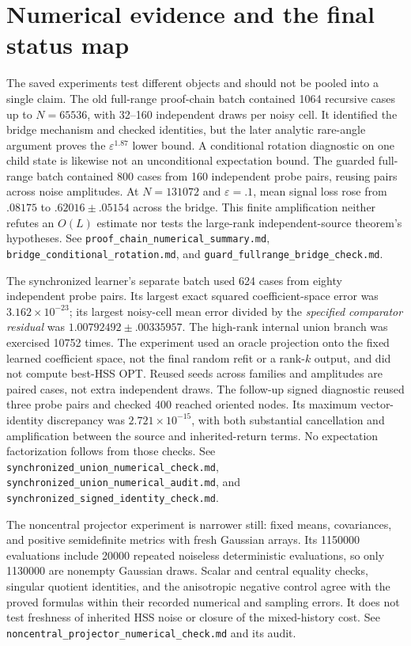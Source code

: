 \documentclass[11pt,oneside,openany,a4paper]{report}
\numberwithin{equation}{chapter}
\theoremstyle{definition}
\theoremstyle{remark}
\newcommand{\sourcefile}[1]{{\small\nolinkurl{#1}}}
\begin{document}
\section{Numerical evidence and the final status map}
\label{sec:later-status}

The saved experiments test different objects and should not be pooled
into a single claim.  The old full-range proof-chain batch contained
1064 recursive cases up to $N=65536$, with 32--160 independent draws
per noisy cell.  It identified the bridge mechanism and checked
identities, but the later analytic rare-angle argument proves the
$\varepsilon^{1.87}$ lower bound.  A conditional rotation diagnostic
on one child state is likewise not an unconditional expectation bound.
The guarded full-range batch contained 800 cases from 160 independent
probe pairs, reusing pairs across noise amplitudes.  At $N=131072$ and
$\varepsilon=.1$, mean signal loss rose from $.08175$ to
$.62016\pm.05154$ across the bridge.  This finite amplification neither
refutes an $O(L)$ estimate nor tests the large-rank independent-source
theorem's hypotheses.  See \sourcefile{proof_chain_numerical_summary.md},
\sourcefile{bridge_conditional_rotation.md}, and
\sourcefile{guard_fullrange_bridge_check.md}.

The synchronized learner's separate batch used 624 cases from eighty
independent probe pairs.  Its largest exact squared coefficient-space
error was $3.162\times10^{-23}$; its largest noisy-cell mean error
divided by the \emph{specified comparator residual} was
$1.00792492\pm.00335957$.  The high-rank internal union branch was
exercised 10752 times.  The experiment used an oracle projection onto
the fixed learned coefficient space, not the final random refit or a
rank-$k$ output, and did not compute best-HSS OPT.  Reused seeds across
families and amplitudes are paired cases, not extra independent draws.
The follow-up signed diagnostic reused three probe pairs and checked
400 reached oriented nodes.  Its maximum vector-identity discrepancy
was $2.721\times10^{-15}$, with both substantial cancellation and
amplification between the source and inherited-return terms.  No
expectation factorization follows from those checks.
See \sourcefile{synchronized_union_numerical_check.md},
\sourcefile{synchronized_union_numerical_audit.md}, and
\sourcefile{synchronized_signed_identity_check.md}.

The noncentral projector experiment is narrower still: fixed means,
covariances, and positive semidefinite metrics with fresh Gaussian
arrays.  Its 1150000 evaluations include 20000 repeated noiseless
deterministic evaluations, so only 1130000 are nonempty Gaussian draws.
Scalar and central equality checks, singular quotient identities, and
the anisotropic negative control agree with the proved formulas within
their recorded numerical and sampling errors.  It does not test
freshness of inherited HSS noise or closure of the mixed-history cost.
See \sourcefile{noncentral_projector_numerical_check.md} and its audit.
\end{document}
